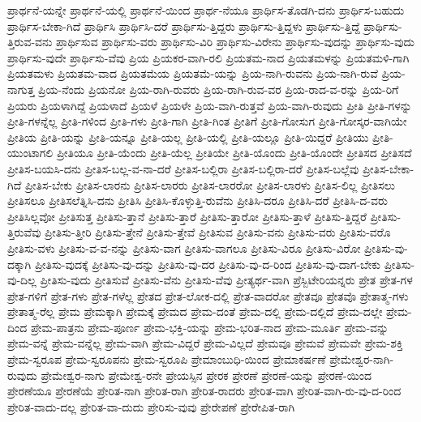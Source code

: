 {ಪ್ರಾರ್ಥನೆ-ಯನ್ನೇ
ಪ್ರಾರ್ಥನೆ-ಯಲ್ಲಿ
ಪ್ರಾರ್ಥನೆ-ಯಿಂದ
ಪ್ರಾರ್ಥ-ನೆಯೂ
ಪ್ರಾರ್ಥಿಸ-ತೊಡಗಿ-ದನು
ಪ್ರಾರ್ಥಿಸ-ಬಹುದು
ಪ್ರಾರ್ಥಿಸ-ಬೇಕಾ-ಗಿದೆ
ಪ್ರಾರ್ಥಿಸಿ
ಪ್ರಾರ್ಥಿಸಿ-ದರೆ
ಪ್ರಾರ್ಥಿಸು-ತ್ತಿದ್ದರು
ಪ್ರಾರ್ಥಿಸು-ತ್ತಿದ್ದಳು
ಪ್ರಾರ್ಥಿಸು-ತ್ತಿದ್ದೆ
ಪ್ರಾರ್ಥಿಸು-ತ್ತಿರುವ-ವನು
ಪ್ರಾರ್ಥಿಸುವ
ಪ್ರಾರ್ಥಿಸು-ವರು
ಪ್ರಾರ್ಥಿಸು-ವಿರಿ
ಪ್ರಾರ್ಥಿಸು-ವಿರೇನು
ಪ್ರಾರ್ಥಿಸು-ವುದನ್ನು
ಪ್ರಾರ್ಥಿಸು-ವುದು
ಪ್ರಾರ್ಥಿಸು-ವುದೇ
ಪ್ರಾರ್ಥಿಸು-ವೆವು
ಪ್ರಿಯ
ಪ್ರಿಯಕರ-ವಾಗಿ-ರಲಿ
ಪ್ರಿಯತಮ-ನಾದ
ಪ್ರಿಯತಮಳನ್ನು
ಪ್ರಿಯತಮಳಿ-ಗಾಗಿ
ಪ್ರಿಯತಮಳು
ಪ್ರಿಯತಮ-ವಾದ
ಪ್ರಿಯತಮೆಯ
ಪ್ರಿಯತಮೆ-ಯನ್ನು
ಪ್ರಿಯ-ನಾಗಿ-ರುವನು
ಪ್ರಿಯ-ನಾಗಿ-ರುವೆ
ಪ್ರಿಯ-ನಾಗುತ್ತ
ಪ್ರಿಯ-ನೆಂದು
ಪ್ರಿಯನೋ
ಪ್ರಿಯ-ರಾಗಿ-ರುವರು
ಪ್ರಿಯ-ರಾಗಿ-ರುವ-ವರ
ಪ್ರಿಯ-ರಾದ-ವ-ರನ್ನು
ಪ್ರಿಯ-ರಿಗೆ
ಪ್ರಿಯರು
ಪ್ರಿಯಳಾಗಿದ್ದೆ
ಪ್ರಿಯಳಾದೆ
ಪ್ರಿಯಳೆ
ಪ್ರಿಯಳೇ
ಪ್ರಿಯ-ವಾಗಿ-ರುತ್ತವೆ
ಪ್ರಿಯ-ವಾಗಿ-ರುವುದು
ಪ್ರೀತಿ
ಪ್ರೀತಿ-ಗಳನ್ನು
ಪ್ರೀತಿ-ಗಳನ್ನೆಲ್ಲ
ಪ್ರೀತಿ-ಗಳಿಂದ
ಪ್ರೀತಿ-ಗಳು
ಪ್ರೀತಿ-ಗಾಗಿ
ಪ್ರೀತಿ-ಗಿಂತ
ಪ್ರೀತಿಗೆ
ಪ್ರೀತಿ-ಗೋಸುಗ
ಪ್ರೀತಿ-ಗೋಸ್ಕರ-ವಾಗಿಯೇ
ಪ್ರೀತಿಯ
ಪ್ರೀತಿ-ಯನ್ನು
ಪ್ರೀತಿ-ಯನ್ನೂ
ಪ್ರೀತಿ-ಯಲ್ಲ
ಪ್ರೀತಿ-ಯಲ್ಲಿ
ಪ್ರೀತಿ-ಯಲ್ಲೂ
ಪ್ರೀತಿ-ಯಿದ್ದರೆ
ಪ್ರೀತಿಯು
ಪ್ರೀತಿ-ಯುಂಟಾಗಲಿ
ಪ್ರೀತಿಯೂ
ಪ್ರೀತಿ-ಯೆಂದು
ಪ್ರೀತಿ-ಯೆಲ್ಲ
ಪ್ರೀತಿಯೇ
ಪ್ರೀತಿ-ಯೊಂದು
ಪ್ರೀತಿ-ಯೊಂದೇ
ಪ್ರೀತಿಸದ
ಪ್ರೀತಿಸದೆ
ಪ್ರೀತಿಸ-ಬಯಸಿ-ದನು
ಪ್ರೀತಿಸ-ಬಲ್ಲ-ವ-ನಾ-ದರೆ
ಪ್ರೀತಿಸ-ಬಲ್ಲಿರಾ
ಪ್ರೀತಿಸ-ಬಲ್ಲಿರಾ-ದರೆ
ಪ್ರೀತಿಸ-ಬಲ್ಲೆವು
ಪ್ರೀತಿಸ-ಬೇಕಾ-ಗಿದೆ
ಪ್ರೀತಿಸ-ಬೇಕು
ಪ್ರೀತಿಸ-ಲಾರನು
ಪ್ರೀತಿಸ-ಲಾರರು
ಪ್ರೀತಿಸ-ಲಾರರೋ
ಪ್ರೀತಿಸ-ಲಾರಳು
ಪ್ರೀತಿಸ-ಲಿಲ್ಲ
ಪ್ರೀತಿಸಲು
ಪ್ರೀತಿಸಲೂ
ಪ್ರೀತಿಸಲೆತ್ನಿಸಿ-ದನು
ಪ್ರೀತಿಸಿ
ಪ್ರೀತಿಸಿ-ಕೊಳ್ಳುತ್ತಿ-ರುವೆನು
ಪ್ರೀತಿಸಿ-ದರೂ
ಪ್ರೀತಿಸಿ-ದರೆ
ಪ್ರೀತಿಸಿ-ದ-ವರು
ಪ್ರೀತಿಸಿಲ್ಲವೋ
ಪ್ರೀತಿಸುತ್ತ
ಪ್ರೀತಿಸು-ತ್ತಾನೆ
ಪ್ರೀತಿಸು-ತ್ತಾರೆ
ಪ್ರೀತಿಸು-ತ್ತಾರೋ
ಪ್ರೀತಿಸು-ತ್ತಾಳೆ
ಪ್ರೀತಿಸು-ತ್ತಿದ್ದರೆ
ಪ್ರೀತಿಸು-ತ್ತಿರುವೆವು
ಪ್ರೀತಿಸು-ತ್ತೀರಿ
ಪ್ರೀತಿಸು-ತ್ತೇನೆ
ಪ್ರೀತಿಸು-ತ್ತೇವೆ
ಪ್ರೀತಿಸುವ
ಪ್ರೀತಿಸು-ವನು
ಪ್ರೀತಿಸು-ವರು
ಪ್ರೀತಿಸು-ವರೊ
ಪ್ರೀತಿಸು-ವಳು
ಪ್ರೀತಿಸು-ವ-ವ-ನನ್ನು
ಪ್ರೀತಿಸು-ವಾಗ
ಪ್ರೀತಿಸು-ವಾಗಲೂ
ಪ್ರೀತಿಸು-ವಿರೂ
ಪ್ರೀತಿಸು-ವಿರೋ
ಪ್ರೀತಿಸು-ವು-ದಕ್ಕಾಗಿ
ಪ್ರೀತಿಸು-ವುದಕ್ಕೆ
ಪ್ರೀತಿಸು-ವು-ದನ್ನು
ಪ್ರೀತಿಸು-ವು-ದರ
ಪ್ರೀತಿಸು-ವು-ದ-ರಿಂದ
ಪ್ರೀತಿಸು-ವು-ದಾಗ-ಬೇಕು
ಪ್ರೀತಿಸು-ವು-ದಿಲ್ಲ
ಪ್ರೀತಿಸು-ವುದು
ಪ್ರೀತಿಸುವೆ
ಪ್ರೀತಿಸು-ವೆನು
ಪ್ರೀತಿಸು-ವೆವು
ಪ್ರೀತ್ಯರ್ಥ-ವಾಗಿ
ಪ್ರೆಸ್ಬಿಟೇರಿಯನ್ನರು
ಪ್ರೇತ
ಪ್ರೇತ-ಗಳ
ಪ್ರೇತ-ಗಳಿಗೆ
ಪ್ರೇತ-ಗಳು
ಪ್ರೇತ-ಗಳೆಲ್ಲ
ಪ್ರೇತದ
ಪ್ರೇತ-ಲೋಕ-ದಲ್ಲಿ
ಪ್ರೇತ-ವಾದರೋ
ಪ್ರೇತವೂ
ಪ್ರೇತವೊ
ಪ್ರೇತಾತ್ಮ-ಗಳು
ಪ್ರೇತಾತ್ಮ-ರೆಲ್ಲ
ಪ್ರೇಮ
ಪ್ರೇಮಕ್ಕಾಗಿ
ಪ್ರೇಮಕ್ಕೆ
ಪ್ರೇಮದ
ಪ್ರೇಮ-ದಂತೆ
ಪ್ರೇಮ-ದಲ್ಲಿ
ಪ್ರೇಮ-ದಲ್ಲಿದೆ
ಪ್ರೇಮ-ದಲ್ಲೇ
ಪ್ರೇಮ-ದಿಂದ
ಪ್ರೇಮ-ಪಾತ್ರನು
ಪ್ರೇಮ-ಪೂರ್ಣ
ಪ್ರೇಮ-ಭಕ್ತಿ-ಯನ್ನು
ಪ್ರೇಮ-ಭರಿತ-ನಾದ
ಪ್ರೇಮ-ಮೂರ್ತಿ
ಪ್ರೇಮ-ವನ್ನು
ಪ್ರೇಮ-ವನ್ನೆ
ಪ್ರೇಮ-ವನ್ನೆಲ್ಲ
ಪ್ರೇಮ-ವಾಗಿ
ಪ್ರೇಮ-ವಿದ್ದರೆ
ಪ್ರೇಮ-ವಿಲ್ಲದೆ
ಪ್ರೇಮವೂ
ಪ್ರೇಮವೆ
ಪ್ರೇಮವೇ
ಪ್ರೇಮ-ಶಕ್ತಿ
ಪ್ರೇಮ-ಸ್ವರೂಪ
ಪ್ರೇಮ-ಸ್ವರೂಪನು
ಪ್ರೇಮ-ಸ್ವರೂಪಿ
ಪ್ರೇಮಾಂಬುಧಿ-ಯಿಂದ
ಪ್ರೇಮಾಕರ್ಷಣೆ
ಪ್ರೇಮೇಶ್ವರ-ನಾಗಿ-ರುವುದು
ಪ್ರೇಮೇಶ್ವರ-ನಾಗು
ಪ್ರೇಮೇಶ್ವ-ರನೇ
ಪ್ರೇಯಸ್ಸಿನ
ಪ್ರೇರಕ
ಪ್ರೇರಣೆ
ಪ್ರೇರಣೆ-ಯನ್ನು
ಪ್ರೇರಣೆ-ಯಿಂದ
ಪ್ರೇರಣೆಯೂ
ಪ್ರೇರಣೆಯೆ
ಪ್ರೇರಿತ-ನಾಗಿ
ಪ್ರೇರಿತ-ರಾಗಿ
ಪ್ರೇರಿತ-ರಾದರು
ಪ್ರೇರಿತ-ವಾಗಿ
ಪ್ರೇರಿತ-ವಾಗಿ-ರು-ವು-ದ-ರಿಂದ
ಪ್ರೇರಿತ-ವಾದು-ದಲ್ಲ
ಪ್ರೇರಿತ-ವಾ-ದುದು
ಪ್ರೇರಿಸು-ವುವು
ಪ್ರೇರೇಪಣೆ
ಪ್ರೇರೇಪಿತ-ರಾಗಿ
}

